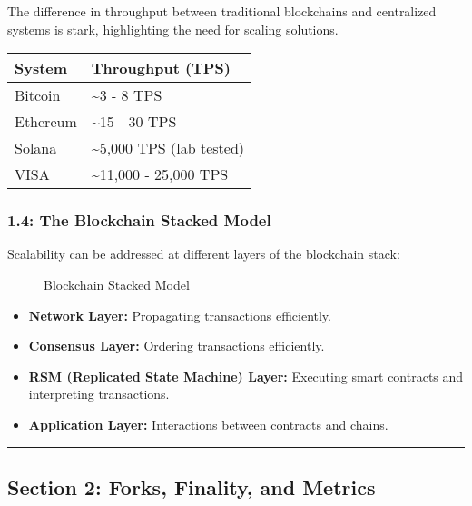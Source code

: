 The difference in throughput between traditional blockchains and
centralized systems is stark, highlighting the need for scaling
solutions.

\begin{tabular}{ll}
	\toprule
	System & Throughput (TPS) \\
	\midrule
	Bitcoin & \textasciitilde3 - 8 TPS \\
	Ethereum & \textasciitilde15 - 30 TPS \\
	Solana & \textasciitilde5,000 TPS (lab tested) \\
	VISA & \textasciitilde11,000 - 25,000 TPS \\
	\bottomrule
\end{tabular}

\subsubsection{1.4: The Blockchain Stacked
Model}\label{the-blockchain-stacked-model}

Scalability can be addressed at different layers of the blockchain
stack:

\begin{figure}
\centering
\caption{Blockchain Stacked Model}
\end{figure}

\begin{itemize}
\tightlist
\item
  \textbf{Network Layer:} Propagating transactions efficiently.
\item
  \textbf{Consensus Layer:} Ordering transactions efficiently.
\item
  \textbf{RSM (Replicated State Machine) Layer:} Executing smart
  contracts and interpreting transactions.
\item
  \textbf{Application Layer:} Interactions between contracts and chains.
\end{itemize}

\begin{center}\rule{0.5\linewidth}{0.5pt}\end{center}

\subsection{Section 2: Forks, Finality, and
Metrics}\label{section-2-forks-finality-and-metrics}

